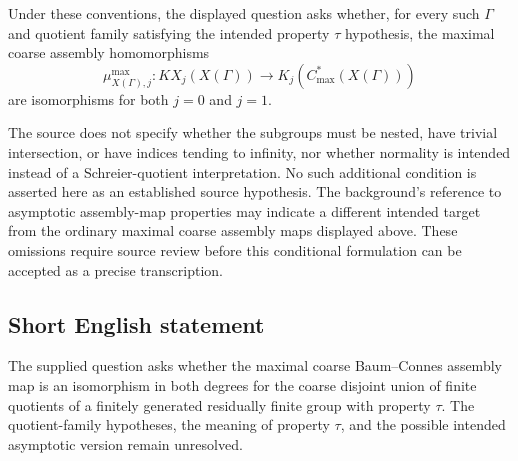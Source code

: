 \documentclass[11pt]{article}
\begin{document}
Under these conventions, the displayed question asks whether, for every such \(\Gamma\) and quotient family satisfying the intended property \(\tau\) hypothesis, the maximal coarse assembly homomorphisms
\[
\mu^{\max}_{X(\Gamma),j}\colon
KX_j(X(\Gamma))\longrightarrow
K_j\!\left(C^*_{\max}(X(\Gamma))\right)
\]
are isomorphisms for both \(j=0\) and \(j=1\).

The source does not specify whether the subgroups must be nested, have trivial intersection, or have indices tending to infinity, nor whether normality is intended instead of a Schreier-quotient interpretation. No such additional condition is asserted here as an established source hypothesis. The background's reference to asymptotic assembly-map properties may indicate a different intended target from the ordinary maximal coarse assembly maps displayed above. These omissions require source review before this conditional formulation can be accepted as a precise transcription.
\subsection{Short English statement}
The supplied question asks whether the maximal coarse Baum--Connes assembly map is an isomorphism in both degrees for the coarse disjoint union of finite quotients of a finitely generated residually finite group with property \(\tau\). The quotient-family hypotheses, the meaning of property \(\tau\), and the possible intended asymptotic version remain unresolved.
\end{document}
